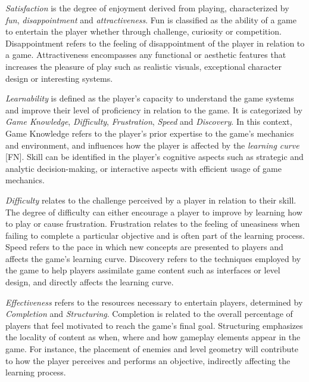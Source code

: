 \documentclass[cic,tc,english]{iiufrgs}
\begin{document}
\emph{Satisfaction} is the degree of enjoyment derived from playing, characterized by \emph{fun}, \emph{disappointment} and \emph{attractiveness}. Fun is classified as the ability of a game to entertain the player whether through challenge, curiosity or competition. Disappointment refers to the feeling of disappointment of the player in relation to a game. Attractiveness encompasses any functional or aesthetic features that increases the pleasure of play such as realistic visuals, exceptional character design or interesting systems.

\emph{Learnability} is defined as the player's capacity to understand the game systems and improve their level of proficiency in relation to the game. It is categorized by \emph{Game Knowledge}, \emph{Difficulty}, \emph{Frustration}, \emph{Speed} and \emph{Discovery}. In this context, Game Knowledge refers to the player's prior expertise to the game's mechanics and environment, and influences how the player is affected by the \emph{learning curve} [FN]. Skill can be identified in the player's cognitive aspects such as strategic and analytic decision-making, or interactive aspects with efficient usage of game mechanics.

\emph{Difficulty} relates to the challenge perceived by a player in relation to their skill. The degree of difficulty can either encourage a player to improve by learning how to play or cause frustration. Frustration relates to the feeling of uneasiness when failing to complete a particular objective and is often part of the learning process. Speed refers to the pace in which new concepts are presented to players and affects the game's learning curve. Discovery refers to the techniques employed by the game to help players assimilate game content such as interfaces or level design, and directly affects the learning curve.

\emph{Effectiveness} refers to the resources necessary to entertain players, determined by \emph{Completion} and \emph{Structuring}. Completion is related to the overall percentage of players that feel motivated to reach the game's final goal. Structuring emphasizes the locality of content as when, where and how gameplay elements appear in the game. For instance, the placement of enemies and level geometry will contribute to how the player perceives and performs an objective, indirectly affecting the learning process.
\end{document}
